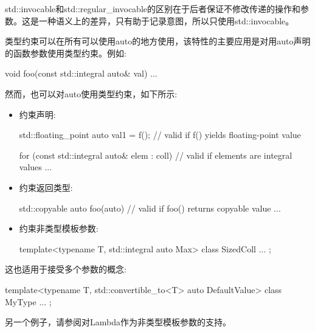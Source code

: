 std::invocable和std::regular\_invocable的区别在于后者保证不修改传递的操作和参数。这是一种语义上的差异，只有助于记录意图，所以只使用std::invocable。


类型约束可以在所有可以使用auto的地方使用，该特性的主要应用是对用auto声明的函数参数使用类型约束。例如:

\begin{cpp}
void foo(const std::integral auto& val)
{
	...
}
\end{cpp}

然而，也可以对auto使用类型约束，如下所示:

\begin{itemize}
\item
约束声明:

\begin{cpp}
std::floating_point auto val1 = f(); // valid if f() yields floating-point value

for (const std::integral auto& elem : coll) { // valid if elements are integral values
	...
}
\end{cpp}

\item
约束返回类型:

\begin{cpp}
std::copyable auto foo(auto) { // valid if foo() returns copyable value
	...
}
\end{cpp}

\item
约束非类型模板参数:

\begin{cpp}
template<typename T, std::integral auto Max>
class SizedColl {
	...
};
\end{cpp}
\end{itemize}

这也适用于接受多个参数的概念:

\begin{cpp}
template<typename T, std::convertible_to<T> auto DefaultValue>
class MyType {
	...
};
\end{cpp}

另一个例子，请参阅对Lambda作为非类型模板参数的支持。












